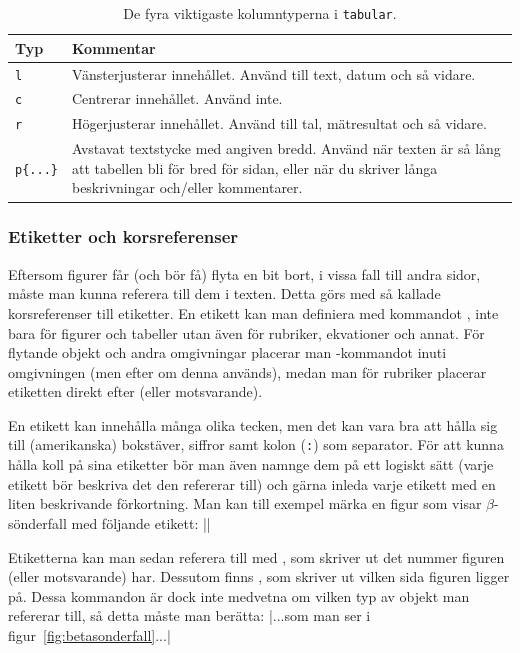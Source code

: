 \documentclass[../../latex.tex]{subfiles}
\begin{document}
\begin{table}[tbp]
	\centering 
	\caption{De fyra viktigaste kolumntyperna i \texttt{tabular}.}
	\label{tab:kolumner}
	\begin{tabular}{l p{}}
		\toprule 
		Typ & Kommentar \\
		\midrule 
		\texttt{l} & Vänsterjusterar innehållet. Använd till text, datum
					 och så vidare. \\
		\texttt{c} & Centrerar innehållet. Använd inte. \\
		\texttt{r} & Högerjusterar innehållet. Använd till tal, 
				     mätresultat och så vidare. \\
		\texttt{p\{...\}} & Avstavat textstycke med angiven bredd. Använd
							när texten är så lång att tabellen bli för
							bred för sidan, eller när du skriver långa
							beskrivningar och/eller kommentarer. \\
		\bottomrule 
	\end{tabular}
\end{table}

\subsubsection{Etiketter och korsreferenser}\label{sec:labels}
Eftersom figurer får (och bör få) flyta en bit bort, i vissa fall till 
andra sidor, måste man kunna referera till dem i texten. Detta görs med så
kallade korsreferenser till etiketter. En etikett kan man definiera med
kommandot , inte bara för figurer och tabeller utan även för
rubriker, ekvationer och annat. För flytande objekt och andra omgivningar
placerar man -kommandot inuti omgivningen (men efter 
 om denna används), medan man för rubriker placerar etiketten
direkt efter  (eller motsvarande).

En etikett kan innehålla många olika tecken, men det kan vara bra att
hålla sig till (amerikanska) bokstäver, siffror samt kolon (\texttt{:}) 
som separator.
För att kunna hålla koll på sina etiketter bör man även namnge dem på ett
logiskt sätt (varje etikett bör beskriva det den refererar till) och gärna
inleda varje etikett med en liten beskrivande förkortning. Man kan till
exempel märka en figur som visar \(\beta\)-sönderfall med följande etikett:
\latex|\label{fig:betasonderfall}|

Etiketterna kan man sedan referera till med , som skriver ut det
nummer figuren (eller motsvarande) har. Dessutom finns , som
skriver ut vilken sida figuren ligger på. Dessa kommandon är dock inte
medvetna om vilken typ av objekt man refererar till, så detta måste man
berätta:
\latex|...som man ser i figur~\ref{fig:betasonderfall}...|
\end{document}
